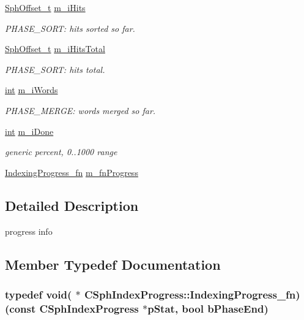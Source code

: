 \begin{DoxyCompactItemize}
\hyperlink{sphinx_8h_a0fb3b64afebef33c61367714754eaa90}{Sph\-Offset\-\_\-t} \hyperlink{structCSphIndexProgress_af102bc45918ece2ba64682c3e3f7db25}{m\-\_\-i\-Hits}
\begin{DoxyCompactList}\small\item\em P\-H\-A\-S\-E\-\_\-\-S\-O\-R\-T\-: hits sorted so far. \end{DoxyCompactList}\item 
\hyperlink{sphinx_8h_a0fb3b64afebef33c61367714754eaa90}{Sph\-Offset\-\_\-t} \hyperlink{structCSphIndexProgress_ad731d8b12fc557bd27ad3036560f8cd4}{m\-\_\-i\-Hits\-Total}
\begin{DoxyCompactList}\small\item\em P\-H\-A\-S\-E\-\_\-\-S\-O\-R\-T\-: hits total. \end{DoxyCompactList}\item 
\hyperlink{sphinxexpr_8cpp_a4a26e8f9cb8b736e0c4cbf4d16de985e}{int} \hyperlink{structCSphIndexProgress_a3a6cc2a33860b5956c7147ce145434f4}{m\-\_\-i\-Words}
\begin{DoxyCompactList}\small\item\em P\-H\-A\-S\-E\-\_\-\-M\-E\-R\-G\-E\-: words merged so far. \end{DoxyCompactList}\item 
\hyperlink{sphinxexpr_8cpp_a4a26e8f9cb8b736e0c4cbf4d16de985e}{int} \hyperlink{structCSphIndexProgress_a0b0973438825896226077882ce070e56}{m\-\_\-i\-Done}
\begin{DoxyCompactList}\small\item\em generic percent, 0..1000 range \end{DoxyCompactList}\item 
\hyperlink{structCSphIndexProgress_ae4d818fe1ea74a250088fcc7b77fdf63}{Indexing\-Progress\-\_\-fn} \hyperlink{structCSphIndexProgress_a4639ab9f99975ea875afd66c3a3514c3}{m\-\_\-fn\-Progress}
\end{DoxyCompactItemize}


\subsection{Detailed Description}
progress info 

\subsection{Member Typedef Documentation}
\hypertarget{structCSphIndexProgress_ae4d818fe1ea74a250088fcc7b77fdf63}{
\subsubsection[{Indexing\-Progress\-\_\-fn}]{\setlength{\rightskip}{0pt plus 5cm}typedef void( $\ast$ C\-Sph\-Index\-Progress\-::\-Indexing\-Progress\-\_\-fn)(const {\bf C\-Sph\-Index\-Progress} $\ast$p\-Stat, bool b\-Phase\-End)}}\label{structCSphIndexProgress_ae4d818fe1ea74a250088fcc7b77fdf63}


